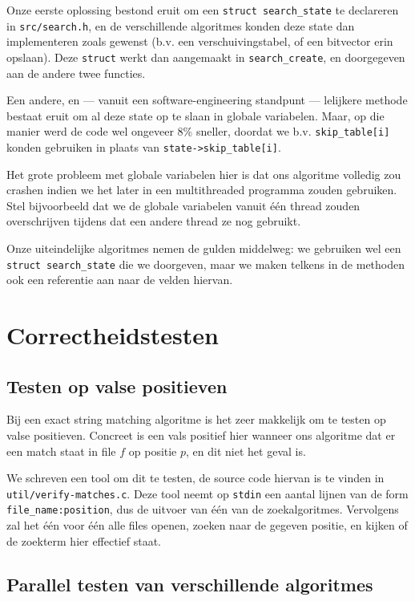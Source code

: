 \documentclass[a4paper,11pt]{article}
\begin{document}
Onze eerste oplossing bestond eruit om een \verb#struct search_state# te
declareren in \verb#src/search.h#, en de verschillende algoritmes konden
deze state dan implementeren zoals gewenst (b.v. een verschuivingstabel,
of een bitvector erin opslaan). Deze \verb#struct# werkt dan aangemaakt in
\verb#search_create#, en doorgegeven aan de andere twee functies.

Een andere, en — vanuit een software-engineering standpunt — lelijkere methode
bestaat eruit om al deze state op te slaan in globale variabelen. Maar, op die
manier werd de code wel ongeveer 8\% sneller, doordat we b.v.
\verb#skip_table[i]# konden gebruiken in plaats van \verb#state->skip_table[i]#.

Het grote probleem met globale variabelen hier is dat ons algoritme volledig zou
crashen indien we het later in een multithreaded programma zouden gebruiken.
Stel bijvoorbeeld dat we de globale variabelen vanuit \'e\'en thread zouden
overschrijven tijdens dat een andere thread ze nog gebruikt.

Onze uiteindelijke algoritmes nemen de gulden middelweg: we gebruiken wel een
\verb#struct search_state# die we doorgeven, maar we maken telkens in de
methoden ook een referentie aan naar de velden hiervan.

\section{Correctheidstesten}

\subsection{Testen op valse positieven}

Bij een exact string matching algoritme is het zeer makkelijk om te testen op
valse positieven. Concreet is een vals positief hier wanneer ons algoritme dat
er een match staat in file $f$ op positie $p$, en dit niet het geval is.

We schreven een tool om dit te testen, de source code hiervan is te vinden in
\verb#util/verify-matches.c#. Deze tool neemt op \verb#stdin# een aantal lijnen
van de form \verb#file_name:position#, dus de uitvoer van \'e\'en van de
zoekalgoritmes. Vervolgens zal het \'e\'en voor \'e\'en alle files openen,
zoeken naar de gegeven positie, en kijken of de zoekterm hier effectief staat.

\subsection{Parallel testen van verschillende algoritmes}
\end{document}

